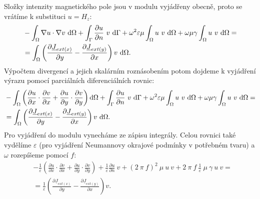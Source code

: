 \documentclass[12pt,a4paper,oneside]{article}
\numberwithin{equation}{section} %
\numberwithin{figure}{section} %
\numberwithin{table}{section} %
\newcommand{\faz}[1]{{\underline{#1}}} %
\begin{document}
Složky intenzity magnetického pole jsou v modulu vyjádřeny obecně, proto se vrátíme k substituci $u = H_z$:
\begin{equation}
\begin{split}
&- \int _{\Omega} \nabla u \cdot \nabla v ~ \ud \Omega + \int _{\Gamma} \frac{\partial u}{\partial n} ~ v ~ \ud \Gamma + \omega ^2 \varepsilon \mu \int _{\Omega} u ~ v ~ \ud \Omega + \omega \mu \gamma \int _{\Omega} u ~ v ~ \ud \Omega = 
\\
&= \int _{\Omega} \left( \frac{\partial \faz{J} _{ext(x)}}{\partial y} - \frac{\partial \faz{J} _{ext(y)}}{\partial x} \right) v ~ \ud \Omega .
\end{split}
\end{equation}
Výpočtem divergencí a jejich skalárním roznásobením potom dojdeme k vyjádření výrazu pomocí parciálních diferenciálních rovnic:
\begin{equation}
\begin{split}
&- \int _{\Omega} \left( \frac{\partial u}{\partial x} \cdot \frac{\partial v}{\partial x} + \frac{\partial u}{\partial y} \cdot \frac{\partial v}{\partial y} \right) \ud \Omega + \int _{\Gamma} \frac{\partial u}{\partial n} ~ v ~ \ud \Gamma + \omega ^2 \varepsilon \mu \int _{\Omega} u ~ v ~ \ud \Omega + \omega \mu \gamma \int _{\Omega} u ~ v ~ \ud \Omega = 
\\
&= \int _{\Omega} \left( \frac{\partial \faz{J} _{ext(x)}}{\partial y} - \frac{\partial \faz{J} _{ext(y)}}{\partial x} \right) v ~ \ud \Omega .
\end{split}
\end{equation}
Pro vyjádření do modulu vynecháme ze zápisu integrály. Celou rovnici také vydělíme $\varepsilon$ (pro vyjádření Neumannovy okrajové podmínky v potřebném tvaru) a $\omega$ rozepíšeme pomocí $f$:
\begin{equation}
\label{HzWeakEpsilon}
\begin{split}
&- \frac{1}{\varepsilon} \left( \frac{\partial u}{\partial x} \cdot \frac{\partial v}{\partial x} + \frac{\partial u}{\partial y} \cdot \frac{\partial v}{\partial y} \right) + \frac{1}{\varepsilon} \frac{\partial u}{\partial n} ~ v + (2 ~ \pi ~ f) ^2 ~ \mu ~ u ~ v + 2 ~ \pi ~ f ~ \frac{1}{\varepsilon} ~ \mu ~ \gamma ~ u ~ v =\\
&= \frac{1}{\varepsilon} \left( \frac{\partial \faz{J} _{ext(x)}}{\partial y} - \frac{\partial \faz{J} _{ext(y)}}{\partial x} \right) v .
\end{split}
\end{equation}
\end{document}
